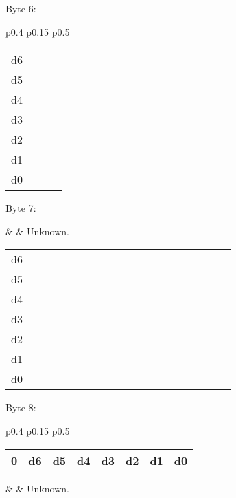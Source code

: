Byte 6:

\begin{tabular}{p{0.4\linewidth} p{0.15\linewidth} p{0.5\linewidth}} 

\begin{tabular}{|p{0.3cm}|p{0.3cm}|p{0.3cm}|p{0.3cm}|p{0.3cm}|p{0.3cm}|p{0.3cm}|p{0.3cm}|}
\hline
0 & d6 & d5 & d4 & d3 & d2 & d1 & d0\\
\hline
\end{tabular}
&  & Unknown.\\
\end{tabular}

\begin{tabular}{p{0.05\linewidth} p{0.6\linewidth}} 
d6 & \\
d5 & \\
d4 & \\
d3 & \\
d2 & \\
d1 & \\
d0 & \\
\end{tabular}

Byte 7:

&  & Unknown.\\
\end{tabular}

\begin{tabular}{p{0.05\linewidth} p{0.6\linewidth}} 
d6 & \\
d5 & \\
d4 & \\
d3 & \\
d2 & \\
d1 & \\
d0 & \\
\end{tabular}

Byte 8:

\begin{tabular}{p{0.4\linewidth} p{0.15\linewidth} p{0.5\linewidth}} 

\begin{tabular}{|p{0.3cm}|p{0.3cm}|p{0.3cm}|p{0.3cm}|p{0.3cm}|p{0.3cm}|p{0.3cm}|p{0.3cm}|}
\hline
0 & d6 & d5 & d4 & d3 & d2 & d1 & d0\\
\hline
\end{tabular}
&  & Unknown.\\
\end{tabular}

